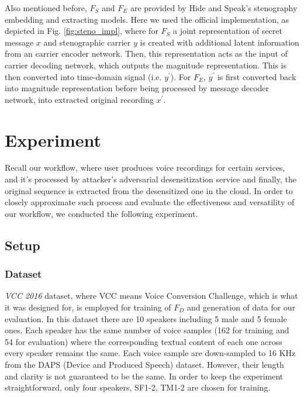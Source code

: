 \documentclass[conference]{IEEEtran}
\begin{document}
Also mentioned before, $F_S$ and $F_E$ are provided by Hide and Speak's stenography embedding and extracting models. Here we used the official implementation, as depicted in Fig. \ref{fig:steno_impl}, where for $F_S$ a joint representation of secret message $x$ and stenographic carrier $y$ is created with additional latent information from an carrier encoder network. Then, this representation acts as the input of carrier decoding network, which outputs the magnitude representation. This is then converted into time-domain signal (i.e. $y^{\prime}$). For $F_E$, $y^{\prime}$ is first converted back into magnitude representation before being processed by message decoder network, into extracted original recording $x^{\prime}$.

\section{Experiment}
\label{seg:expriment}

Recall our workflow, where user produces voice recordings for certain services, and it's processed by attacker's adversarial desensitization service and finally, the original sequence is extracted from the desensitized one in the cloud. In order to closely approximate such process and evaluate the effectiveness and versatility of our workflow, we conducted the following experiment.

\subsection{Setup}

\subsubsection{Dataset}

\textit{VCC 2016} dataset, where VCC means Voice Conversion Challenge\cite{vcc2016, vcc2016eval, vcc2016mss}, which is what it was designed for, is employed for training of $F_D$ and generation of data for our evaluation. In this dataset there are 10 speakers including 5 male and 5 female ones. Each speaker has the same number of voice samples (162 for training and 54 for evaluation) where the corresponding textual content of each one across every speaker remains the same. Each voice sample are down-sampled to 16 KHz from the DAPS (Device and Produced Speech) dataset. However, their length and clarity is not guaranteed to be the same. In order to keep the experiment straightforward, only four speakers, SF1-2, TM1-2 are chosen for training.
\end{document}
